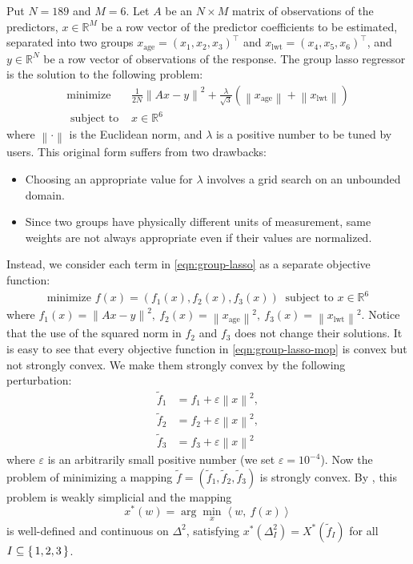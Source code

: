 \documentclass[letterpaper]{article} %
\theoremstyle{plain}
\newcommand{\norm}[1]{\left\| #1 \right\|}
\newcommand{\paren}[1]{\left( #1 \right)}
\newcommand{\inprod}[2]{\left\langle #1,\ #2 \right\rangle}
\newcommand{\R}{\mathbb{R}}
\begin{document}
Put $N = 189$ and $M = 6$.
Let $A$ be an $N \times M$ matrix of observations of the predictors, $x \in \R^M$ be a row vector of the predictor coefficients to be estimated, separated into two groups $x_\text{age} = (x_1, x_2, x_3)^\top$ and $x_\text{lwt} = (x_4, x_5, x_6)^\top$, and $y \in \R^N$ be a row vector of observations of the response.
The group lasso regressor is the solution to the following problem:
\begin{equation}\label{eqn:group-lasso}
    \begin{split}
    \text{minimize } &\frac{1}{2N} \norm{Ax - y}^2 + \frac{\lambda}{\sqrt{3}} \paren{\norm{x_\text{age}} + \norm{x_\text{lwt}}} \\
    \text{ subject to } &x \in \R^6
    \end{split}
\end{equation}
where $\norm{\cdot}$ is the Euclidean norm, and $\lambda$ is a positive number to be tuned by users.
This original form suffers from two drawbacks:
\begin{itemize}
    \item Choosing an appropriate value for $\lambda$ involves a grid search on an unbounded domain.
    \item Since two groups have physically different units of measurement, same weights are not always appropriate even if their values are normalized.
\end{itemize}

Instead, we consider each term in \cref{eqn:group-lasso} as a separate objective function:
\begin{equation}\label{eqn:group-lasso-mop}
    \begin{split}
        \text{minimize } f(x) = (f_1(x), f_2(x), f_3(x)) \  \text{ subject to } x \in \R^6
    \end{split}
\end{equation}
where $f_1(x) = \norm{Ax - y}^2, \ f_2(x) = \norm{x_\text{age}}^2,\ f_3(x) = \norm{x_\text{lwt}}^2$.
Notice that the use of the squared norm in $f_2$ and $f_3$ does not change their solutions.
It is easy to see that every objective function in \cref{eqn:group-lasso-mop} is convex but not strongly convex.
We make them strongly convex by the following perturbation:
\begin{align*}
    \tilde f_1 &= f_1 + \varepsilon \norm{x}^2,\\
    \tilde f_2 &= f_2 + \varepsilon \norm{x}^2,\\
    \tilde f_3 &= f_3 + \varepsilon \norm{x}^2
\end{align*}
where $\varepsilon$ is an arbitrarily small positive number (we set $\varepsilon = 10^{-4}$).
Now the problem of minimizing a mapping $\tilde f = (\tilde f_1, \tilde f_2, \tilde f_3)$ is strongly convex.
By \cite[Theorems 1.1 and 3.1]{Hamada2019}, this problem is weakly simplicial and the mapping
\begin{equation}\label{eqn:group-lasso-sop}
    x^*(w) = \arg\min_x \inprod{w}{f(x)}
\end{equation}
is well-defined and continuous on $\Delta^2$, satisfying $x^*(\Delta^2_I) = X^*(\tilde f_I)$ for all $I \subseteq \set{1, 2, 3}$.
\end{document}

